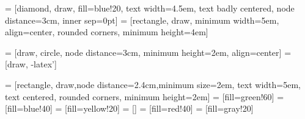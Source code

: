 %
%
%

 = [diamond, draw, fill=blue!20, 
    text width=4.5em, text badly centered, node distance=3cm, inner sep=0pt]
 = [rectangle, draw,
    minimum width=5em, align=center, rounded corners, minimum height=4em]

 = [draw, circle, node distance=3cm,
    minimum height=2em, align=center]
 = [draw, -latex']

 = [rectangle, draw,node distance=2.4cm,minimum size=2em,
    text width=5em, text centered, rounded corners, minimum height=2em]
 = [fill=green!60]
 = [fill=blue!40]    
 = [fill=yellow!20]
 = []
 = [fill=red!40]
 = [fill=gray!20]
    
